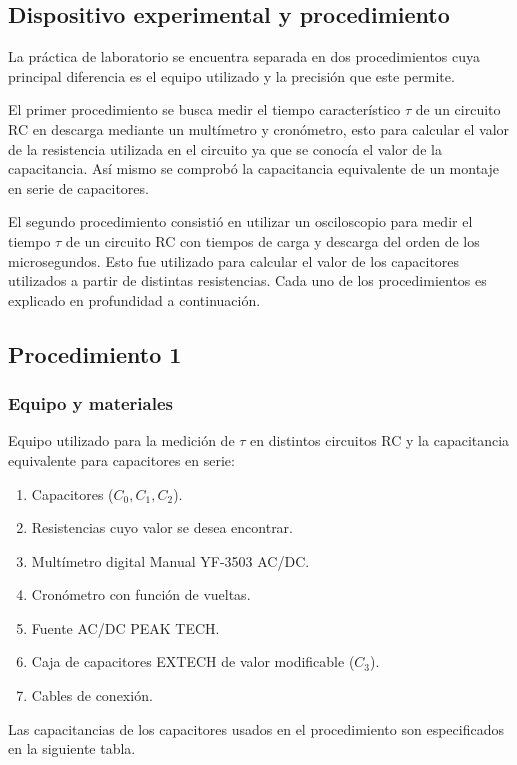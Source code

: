 \documentclass[10pt,letter]{article}
\begin{document}
\begin{multicols}{2}
\section{Dispositivo experimental y procedimiento}
La práctica de laboratorio se encuentra separada en dos procedimientos cuya principal diferencia es el equipo utilizado y la precisión que este permite. 

El primer procedimiento se busca medir el tiempo característico $\tau$ de un circuito RC en descarga mediante un multímetro y cronómetro, esto para calcular el valor de la resistencia utilizada en el circuito ya que se conocía el valor de la capacitancia. Así mismo se comprobó la capacitancia equivalente de un montaje en serie de capacitores. 

El segundo procedimiento consistió en utilizar un osciloscopio para medir el tiempo $\tau$ de un circuito RC con tiempos de carga y descarga del orden de los microsegundos. Esto fue utilizado para calcular el valor de los capacitores utilizados a partir de distintas resistencias. Cada uno de los procedimientos es explicado en profundidad a continuación.

\subsection{Procedimiento 1}
\subsubsection{Equipo y materiales}
Equipo utilizado para la medición de $\tau$ en distintos circuitos RC y la capacitancia equivalente  para capacitores en serie:
\begin{enumerate}
\itemsep=0em
\item Capacitores ($C_0,C_1,C_2$).
\item Resistencias cuyo valor se desea encontrar.
\item Multímetro digital Manual YF-3503 AC/DC.
\item Cronómetro con función de vueltas. 
\item Fuente AC/DC PEAK TECH.
\item Caja de capacitores EXTECH de valor modificable ($C_3$).
\item Cables de conexión.
\end{enumerate}

Las capacitancias de los capacitores usados en el procedimiento son especificados en la siguiente tabla.


\end{multicols}
\end{document}
